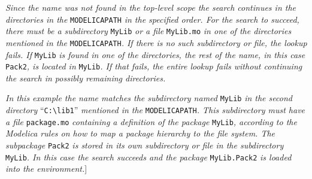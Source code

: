 \emph{Since the name was not found in the top-level scope the search
continues in the directories in the} \lstinline[basicstyle=\ttfamily]!MODELICAPATH! \emph{in the specified
order. For the search to succeed, there must be a subdirectory} \lstinline[basicstyle=\ttfamily]!MyLib!
\emph{or a file} \lstinline[basicstyle=\ttfamily]!MyLib.mo! \emph{in one of the directories mentioned in
the} \lstinline[basicstyle=\ttfamily]!MODELICAPATH!\emph{. If there is no such subdirectory or file, the
lookup fails. If} \lstinline[basicstyle=\ttfamily]!MyLib! \emph{is found in one of the directories, the
rest of the name, in this case} \lstinline[basicstyle=\ttfamily]!Pack2!\emph{, is located in} \lstinline[basicstyle=\ttfamily]!MyLib!\emph{.
If that fails, the entire lookup fails without continuing the search in
possibly remaining directories.}

\emph{In this example the name matches the subdirectory named} \lstinline[basicstyle=\ttfamily]!MyLib!
\emph{in the second directory} ``\lstinline[basicstyle=\ttfamily]!C:\lib1!''
\emph{mentioned in the} \lstinline[basicstyle=\ttfamily]!MODELICAPATH!\emph{. This subdirectory must have
a file} \lstinline[basicstyle=\ttfamily]!package.mo! \emph{containing a definition of the package}
\lstinline[basicstyle=\ttfamily]!MyLib!\emph{, according to the Modelica rules on how to map a package
hierarchy to the file system. The subpackage} \lstinline[basicstyle=\ttfamily]!Pack2! \emph{is stored in
its own subdirectory or file in the subdirectory} \lstinline[basicstyle=\ttfamily]!MyLib!\emph{. In this
case the search succeeds and the package} \lstinline[basicstyle=\ttfamily]!MyLib.Pack2! \emph{is loaded
into the environment.}{]}

